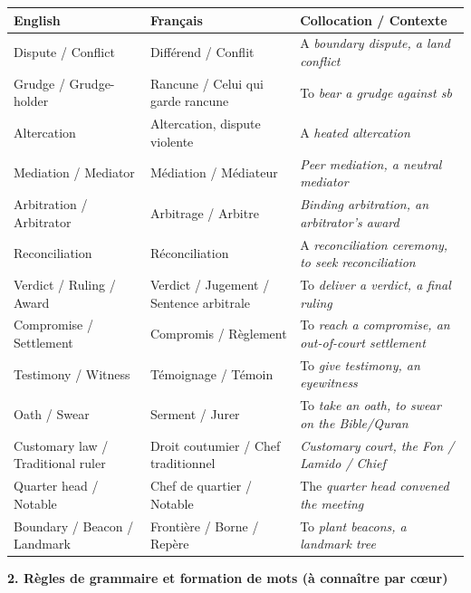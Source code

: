 \documentclass[11pt]{article}
\newcommand{\cle}[1]{{\popxbold\color{popdark}#1}}
\newcommand{\eng}[1]{\ifmmode\text{\textit{#1}}\else\begingroup\selectlanguage{english}\itshape #1\endgroup\fi}
\begin{document}
\begin{bilan}
\begin{center}
\begin{tabularx}{\linewidth}{|X|X|X|}
\hline
\rowcolor{popblueL}
\textbf{English} & \textbf{Français} & \textbf{Collocation / Contexte} \\
\hline
\cle{Dispute} / \cle{Conflict} & Différend / Conflit & A \eng{boundary dispute}, a \eng{land conflict} \\
\cle{Grudge} / \cle{Grudge-holder} & Rancune / Celui qui garde rancune & To \eng{bear a grudge against sb} \\
\cle{Altercation} & Altercation, dispute violente & A \eng{heated altercation} \\
\cle{Mediation} / \cle{Mediator} & Médiation / Médiateur & \eng{Peer mediation}, a \eng{neutral mediator} \\
\cle{Arbitration} / \cle{Arbitrator} & Arbitrage / Arbitre & \eng{Binding arbitration}, an \eng{arbitrator's award} \\
\cle{Reconciliation} & Réconciliation & A \eng{reconciliation ceremony}, to \eng{seek reconciliation} \\
\cle{Verdict} / \cle{Ruling} / \cle{Award} & Verdict / Jugement / Sentence arbitrale & To \eng{deliver a verdict}, a \eng{final ruling} \\
\cle{Compromise} / \cle{Settlement} & Compromis / Règlement & To \eng{reach a compromise}, an \eng{out-of-court settlement} \\
\cle{Testimony} / \cle{Witness} & Témoignage / Témoin & To \eng{give testimony}, an \eng{eyewitness} \\
\cle{Oath} / \cle{Swear} & Serment / Jurer & To \eng{take an oath}, to \eng{swear on the Bible/Quran} \\
\cle{Customary law} / \cle{Traditional ruler} & Droit coutumier / Chef traditionnel & \eng{Customary court}, the \eng{Fon / Lamido / Chief} \\
\cle{Quarter head} / \cle{Notable} & Chef de quartier / Notable & The \eng{quarter head} convened the meeting \\
\cle{Boundary} / \cle{Beacon} / \cle{Landmark} & Frontière / Borne / Repère & To \eng{plant beacons}, a \eng{landmark tree} \\
\hline
\end{tabularx}
\end{center}

\textbf{2. Règles de grammaire et formation de mots (à connaître par cœur)}


\end{bilan}
\end{document}
